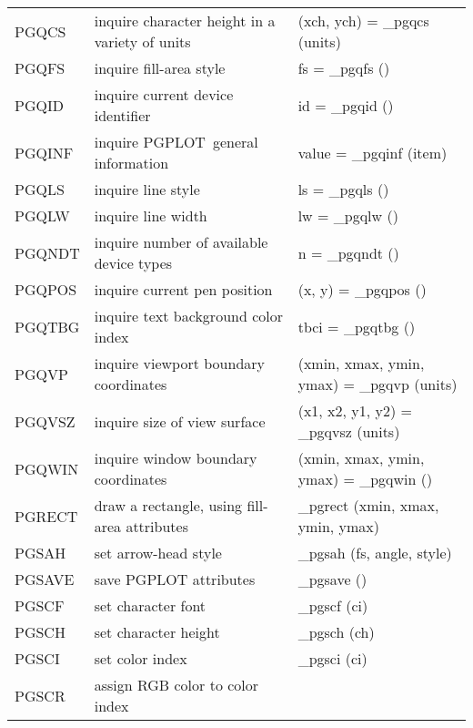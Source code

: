 \documentclass{book}
\newcommand{\pgplot}{{\sc PGPLOT}}
\begin{document}
\begin{center}
\begin{tabular}{|l|p{2.5in}|p{2.25in}|}
PGQCS & inquire character height in a variety of units                 &
(xch, ych) = \_pgqcs (units) \\
PGQFS & inquire fill-area style                                             &
fs = \_pgqfs () \\
PGQID & inquire current device identifier                               &
id = \_pgqid () \\
PGQINF & inquire \pgplot\ general information                             &
value = \_pgqinf (item) \\
PGQLS & inquire line style                                             &
ls = \_pgqls () \\
PGQLW & inquire line width                                             &
lw = \_pgqlw () \\
PGQNDT & inquire number of available device types                                             &
n = \_pgqndt () \\
PGQPOS & inquire current pen position                                             &
(x, y) = \_pgqpos () \\
PGQTBG & inquire text background color index                                            &
tbci = \_pgqtbg () \\
PGQVP & inquire viewport boundary coordinates                    &
(xmin, xmax, ymin, ymax) = \_pgqvp (units) \\
PGQVSZ & inquire size of view surface                    &
(x1, x2, y1, y2) = \_pgqvsz (units) \\
PGQWIN & inquire window boundary coordinates                    &
(xmin, xmax, ymin, ymax) = \_pgqwin () \\
PGRECT & draw a rectangle, using fill-area attributes                    &
\_pgrect (xmin, xmax, ymin, ymax) \\
PGSAH & set arrow-head style                                            &
\_pgsah (fs, angle, style) \\
PGSAVE & save PGPLOT attributes                                         &
\_pgsave () \\
PGSCF & set character font                                              &
\_pgscf (ci) \\
PGSCH & set character height                                            &
\_pgsch (ch) \\
PGSCI & set color index                                                 &
\_pgsci (ci) \\
PGSCR & assign RGB color to color index                              &

\end{tabular}
\end{center}
\end{document}
